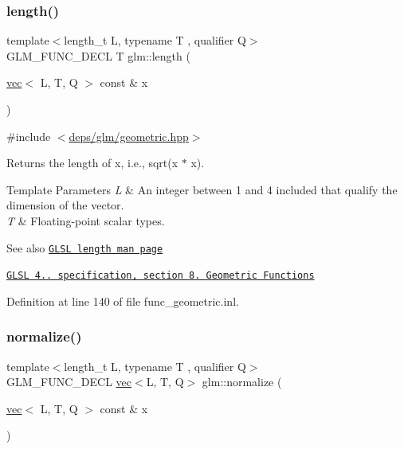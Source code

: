 \subsubsection{\texorpdfstring{length()}{length()}}
{\footnotesize\ttfamily template$<$length\+\_\+t L, typename T , qualifier Q$>$ \\
G\+L\+M\+\_\+\+F\+U\+N\+C\+\_\+\+D\+E\+CL T glm\+::length (\begin{DoxyParamCaption}\item[{\hyperlink{structglm_1_1vec}{vec}$<$ L, T, Q $>$ const \&}]{x }\end{DoxyParamCaption})}



{\ttfamily \#include $<$\hyperlink{geometric_8hpp}{deps/glm/geometric.\+hpp}$>$}

Returns the length of x, i.\+e., sqrt(x $\ast$ x).


\begin{DoxyTemplParams}{Template Parameters}
{\em L} & An integer between 1 and 4 included that qualify the dimension of the vector. \\
\hline
{\em T} & Floating-\/point scalar types.\\
\hline
\end{DoxyTemplParams}
\begin{DoxySeeAlso}{See also}
\href{http://www.opengl.org/sdk/docs/manglsl/xhtml/length.xml}{\tt G\+L\+SL length man page} 

\href{http://www.opengl.org/registry/doc/GLSLangSpec.4.20.8.pdf}{\tt G\+L\+SL 4.. specification, section 8. Geometric Functions} 
\end{DoxySeeAlso}


Definition at line 140 of file func\+\_\+geometric.\+inl.

\mbox{\label{group__core__func__geometric_ga3b8d3dcae77870781392ed2902cce597}} 
\subsubsection{\texorpdfstring{normalize()}{normalize()}}
{\footnotesize\ttfamily template$<$length\+\_\+t L, typename T , qualifier Q$>$ \\
G\+L\+M\+\_\+\+F\+U\+N\+C\+\_\+\+D\+E\+CL \hyperlink{structglm_1_1vec}{vec}$<$L, T, Q$>$ glm\+::normalize (\begin{DoxyParamCaption}\item[{\hyperlink{structglm_1_1vec}{vec}$<$ L, T, Q $>$ const \&}]{x }\end{DoxyParamCaption})}



